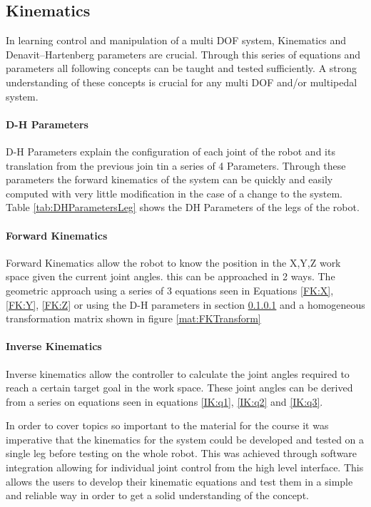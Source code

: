 \documentclass[conference]{IEEEtran}
\begin{document}
\subsection{Kinematics}
    In learning control and manipulation of a multi DOF system, Kinematics and Denavit–Hartenberg parameters are crucial. Through this series of equations and parameters all following concepts can be taught and tested sufficiently. A strong understanding of these concepts is crucial for any multi DOF and/or multipedal system.
    \paragraph{D-H Parameters}\label{DH-Params}
    D-H Parameters explain the configuration of each joint of the robot and its translation from the previous join tin a series of 4 Parameters. Through these parameters the forward kinematics of the system can be quickly and easily computed with very little modification in the case of a change to the system. Table \ref{tab:DHParametersLeg} shows the DH Parameters of the legs of the robot.
    
    \paragraph{Forward Kinematics}
    Forward Kinematics allow the robot to know the position in the X,Y,Z work space given the current joint angles. this can be approached in 2 ways. The geometric approach using a series of 3 equations seen in Equations \ref{FK:X}, \ref{FK:Y}, \ref{FK:Z} or using the D-H parameters in section \ref{DH-Params} and a homogeneous transformation matrix shown in figure \ref{mat:FKTransform}
    
    \paragraph{Inverse Kinematics}
    Inverse kinematics allow the controller to calculate the joint angles required to reach a certain target goal in the work space. These joint angles can be derived from a series on equations seen in equations \ref{IK:q1}, \ref{IK:q2} and \ref{IK:q3}.
   

In order to cover topics so important to the material for the course it was imperative that the kinematics for the system could be developed and tested on a single leg before testing on the whole robot. This was achieved through software integration allowing for individual joint control from the high level interface. This allows the users to develop their kinematic equations and test them in a simple and reliable way in order to get a solid understanding of the concept.
\end{document}
